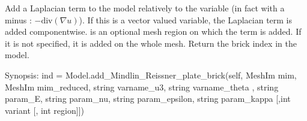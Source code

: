 \documentclass[a4paper,11pt,english]{sphinxmanual}
\begin{document}
\begin{fulllineitems}
\begin{fulllineitems}
\end{fulllineitems}


\begin{fulllineitems}
\label{\detokenize{python/cmdref_Model:getfem.Model.add_Laplacian_brick}}
Add a Laplacian term to the model relatively to the variable 
(in fact with a minus : \(-\text{div}(\nabla u)\)).
If this is a vector valued variable, the Laplacian term is added
componentwise.  is an optional mesh region on which the term
is added. If it is not specified, it is added on the whole mesh. Return
the brick index in the model.

\end{fulllineitems}


\begin{fulllineitems}
\label{\detokenize{python/cmdref_Model:getfem.Model.add_Mindlin_Reissner_plate_brick}}
Synopsis: ind = Model.add\_Mindlin\_Reissner\_plate\_brick(self, MeshIm mim, MeshIm mim\_reduced, string varname\_u3, string varname\_theta , string param\_E, string param\_nu, string param\_epsilon, string param\_kappa {[},int variant {[}, int region{]}{]})


\end{fulllineitems}
\end{fulllineitems}
\end{document}
